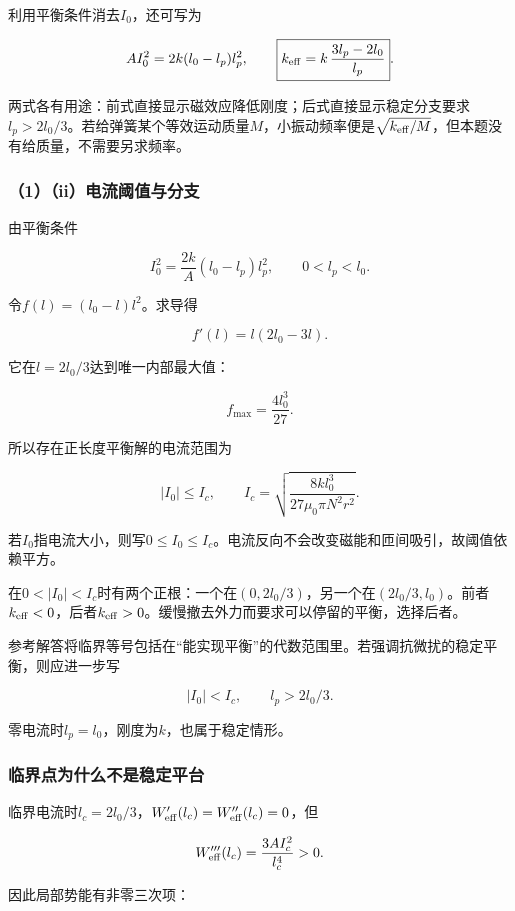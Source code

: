 \documentclass[12pt,a4paper,fontset=fandol]{ctexart}
\begin{document}
利用平衡条件消去\(I_0\)，还可写为

\[
AI_0^2=2k(l_0-l_p)l_p^2,
\qquad
\boxed{k_{\rm eff}=k\,\frac{3l_p-2l_0}{l_p}}.
\]

两式各有用途：前式直接显示磁效应降低刚度；后式直接显示稳定分支要求\(l_p>2l_0/3\)。若给弹簧某个等效运动质量\(M\)，小振动频率便是\(\sqrt{k_{\rm eff}/M}\)，但本题没有给质量，不需要另求频率。

\subsubsection{（1）（ii）电流阈值与分支}\label{iiux7535ux6d41ux9608ux503cux4e0eux5206ux652f}

由平衡条件

\[
I_0^2=\frac{2k}{A}(l_0-l_p)l_p^2,
\qquad 0<l_p<l_0.
\]

令\(f(l)=(l_0-l)l^2\)。求导得

\[
f'(l)=l(2l_0-3l).
\]

它在\(l=2l_0/3\)达到唯一内部最大值：

\[
f_{\max}=\frac{4l_0^3}{27}.
\]

所以存在正长度平衡解的电流范围为

\[
\boxed{|I_0|\leq I_c,\qquad
I_c=\sqrt{\frac{8kl_0^3}{27\mu_0\pi N^2r^2}}}.
\]

若\(I_0\)指电流大小，则写\(0\leq I_0\leq I_c\)。电流反向不会改变磁能和匝间吸引，故阈值依赖平方。

在\(0<|I_0|<I_c\)时有两个正根：一个在\((0,2l_0/3)\)，另一个在\((2l_0/3,l_0)\)。前者\(k_{\rm eff}<0\)，后者\(k_{\rm eff}>0\)。缓慢撤去外力而要求可以停留的平衡，选择后者。

参考解答将临界等号包括在``能实现平衡''的代数范围里。若强调抗微扰的稳定平衡，则应进一步写

\[
\boxed{|I_0|<I_c,\qquad l_p>2l_0/3}.
\]

零电流时\(l_p=l_0\)，刚度为\(k\)，也属于稳定情形。

\subsubsection{临界点为什么不是稳定平台}\label{ux4e34ux754cux70b9ux4e3aux4ec0ux4e48ux4e0dux662fux7a33ux5b9aux5e73ux53f0}

临界电流时\(l_c=2l_0/3\)，\(W'_{\rm eff}(l_c)=W''_{\rm eff}(l_c)=0\)，但

\[
W'''_{\rm eff}(l_c)
=\frac{3AI_c^2}{l_c^4}>0.
\]

因此局部势能有非零三次项：
\end{document}
